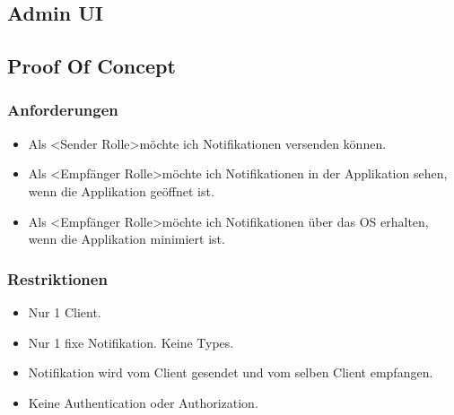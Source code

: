 \clearpage
\subsection{Admin UI}\label{subsec:admin-ui}

\clearpage
\subsection{Proof Of Concept}\label{subsec:proof-of-concept}
\subsubsection*{Anforderungen}
        \begin{itemize}
            \item Als \textless Sender Rolle\textgreater möchte ich Notifikationen versenden können.
            \item Als \textless Empfänger Rolle\textgreater möchte ich Notifikationen in der Applikation sehen, wenn die Applikation geöffnet ist.
            \item Als \textless Empfänger Rolle\textgreater möchte ich Notifikationen über das OS erhalten, wenn die Applikation minimiert ist.
        \end{itemize}
    \subsubsection*{Restriktionen}
        \begin{itemize}
            \item Nur 1 Client. 
            \item Nur 1 fixe Notifikation. Keine Types. 
            \item Notifikation wird vom Client gesendet und vom selben Client empfangen. 
            \item Keine Authentication oder Authorization. 
        \end{itemize}
